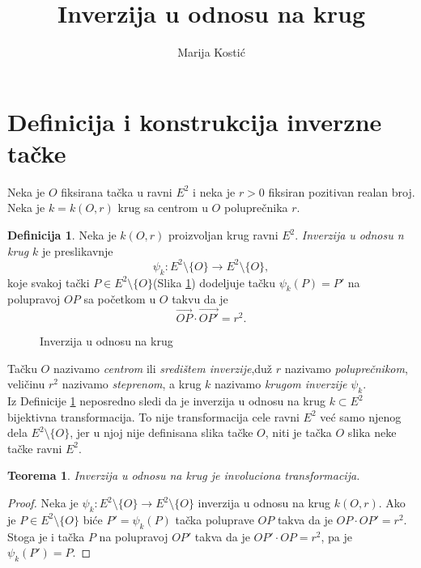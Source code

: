 \documentclass[a4paper,12pt]{article}
\title{\bf Inverzija u odnosu na krug}
\author{Marija Kosti\'{c}}
\date{}
\newtheorem{teorema}{{Teorema}}[section]
\theoremstyle{definition}
\newtheorem{definicija}{{Definicija}}
\begin{document}
\maketitle

\section{Definicija i konstrukcija inverzne ta\v{c}ke}

Neka je $O$ fiksirana ta\v{c}ka u ravni $E^2$ i neka je $r>0$ fiksiran pozitivan realan broj. Neka je $k=k(O,r)$ krug sa centrom u $O$ polupre\v{c}nika $r$.

\begin{definicija}
\label{def:inverzija}
Neka je $k(O,r)$ proizvoljan krug ravni $E^2$. {\it Inverzija u odnosu n krug} $k$ je preslikavnje $$\psi_k : E^2 \setminus \{O\}\longrightarrow E^2 \setminus \{O\},$$ koje svakoj ta\v{c}ki $P \in E^2 \setminus \{O\}$(Slika \ref{slk:inverzija}) dodeljuje ta\v{c}ku $\psi_k (P)=P'$ na polupravoj $OP$ sa po\v{c}etkom u $O$ takvu da je
\begin{equation}
     \overrightarrow{OP} \cdot \overrightarrow{OP'}=r^2.
     \label{eq:1}
\end{equation}
\end{definicija}

\begin{figure}[h]
   \begin{center}
       
   \end{center}
    \caption{Inverzija u odnosu na krug}
    \label{slk:inverzija}
\end{figure}


Ta\v{c}ku $O$ nazivamo {\it centrom} ili {\it sredi\v{s}tem inverzije},du\v{z} $r$ nazivamo {\it polupre\v{c}nikom}, veli\v{c}inu $r^2$ nazivamo {\it steprenom}, a krug $k$ nazivamo {\it krugom inverzije} $\psi_k$.\\

Iz Definicije \ref{def:inverzija} neposredno sledi da je inverzija u odnosu na krug $k\subset E^2$ bijektivna transformacija. To nije transformacija cele ravni $E^2$ ve\'{c} samo njenog dela $E^2 \setminus \{O\}$, jer u njoj nije definisana slika ta\v{c}ke $O$, niti je ta\v{c}ka $O$ slika neke ta\v{c}ke ravni $E^2$.

\begin{teorema}
Inverzija u odnosu na krug je involuciona transformacija.
\end{teorema}
\begin{proof}
Neka je $\psi_k : E^2 \setminus \{O\}\longrightarrow E^2 \setminus \{O\}$ inverzija u odnosu na krug $k(O,r)$. Ako je $P \in  E^2 \setminus \{O\}$ bi\'{c}e $P'=\psi_k(P)$ ta\v{c}ka poluprave $OP$ takva da je $OP \cdot OP'=r^2$. Stoga je i ta\v{c}ka $P$ na polupravoj $OP'$ takva da je $OP' \cdot OP=r^2$, pa je $\psi_k(P')=P$.
\end{proof}
\end{document}
